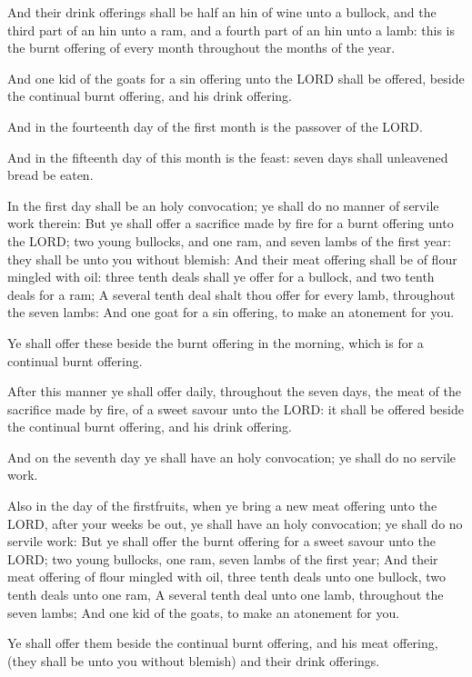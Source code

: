 \verse And their drink offerings shall be half an hin of wine unto a
bullock, and the third part of an hin unto a ram, and a fourth part of
an hin unto a lamb: this is the burnt offering of every month
throughout the months of the year.

\verse And one kid of the goats for a sin offering unto the LORD shall
be offered, beside the continual burnt offering, and his drink
offering.

\verse And in the fourteenth day of the first month is the passover of
the LORD.

\verse And in the fifteenth day of this month is the feast: seven days
shall unleavened bread be eaten.

\verse In the first day shall be an holy convocation; ye shall do no
manner of servile work therein: \verse But ye shall offer a sacrifice
made by fire for a burnt offering unto the LORD; two young bullocks,
and one ram, and seven lambs of the first year: they shall be unto you
without blemish: \verse And their meat offering shall be of flour
mingled with oil: three tenth deals shall ye offer for a bullock, and
two tenth deals for a ram; \verse A several tenth deal shalt thou offer
for every lamb, throughout the seven lambs: \verse And one goat for a
sin offering, to make an atonement for you.

\verse Ye shall offer these beside the burnt offering in the morning,
which is for a continual burnt offering.

\verse After this manner ye shall offer daily, throughout the seven
days, the meat of the sacrifice made by fire, of a sweet savour unto
the LORD: it shall be offered beside the continual burnt offering, and
his drink offering.

\verse And on the seventh day ye shall have an holy convocation; ye
shall do no servile work.

\verse Also in the day of the firstfruits, when ye bring a new meat
offering unto the LORD, after your weeks be out, ye shall have an holy
convocation; ye shall do no servile work: \verse But ye shall offer the
burnt offering for a sweet savour unto the LORD; two young bullocks,
one ram, seven lambs of the first year; \verse And their meat offering
of flour mingled with oil, three tenth deals unto one bullock, two
tenth deals unto one ram, \verse A several tenth deal unto one lamb,
throughout the seven lambs; \verse And one kid of the goats, to make an
atonement for you.

\verse Ye shall offer them beside the continual burnt offering, and his
meat offering, (they shall be unto you without blemish) and their
drink offerings.


